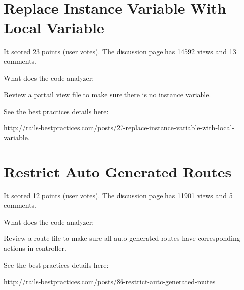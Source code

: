 \section{Replace Instance Variable With Local Variable}


It scored 23 points (user votes). 
The discussion page has 14592 views and 13 comments.

What does the code analyzer:

Review a partail view file to make sure there is no instance variable.

See the best practices details here:
 
\url{http://rails-bestpractices.com/posts/27-replace-instance-variable-with-local-variable.}

\section{Restrict Auto Generated Routes}


It scored 12 points (user votes). 
The discussion page has 11901 views and 5 comments.

What does the code analyzer:

Review a route file to make sure all auto-generated routes have corresponding actions in controller.

See the best practices details here:
 
\url{http://rails-bestpractices.com/posts/86-restrict-auto-generated-routes}

